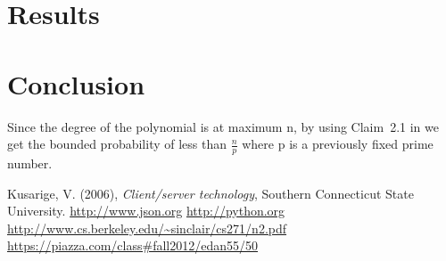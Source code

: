\documentclass{article}
\begin{document}
\section{Results}

\section{Conclusion}

Since the degree of the polynomial is at maximum n, by using Claim~2.1 in \cite[p.~2-1]{alistair} we get the bounded probability of less than $\frac{n}{p}$ where p is a previously fixed prime number.

\newpage

\begin{thebibliography}{9}
Kusarige, V. (2006), \emph{Client/server technology}, Southern Connecticut State University.
\url{http://www.json.org}
\url{http://python.org}
\url{http://www.cs.berkeley.edu/~sinclair/cs271/n2.pdf}
\url{https://piazza.com/class#fall2012/edan55/50}
\end{thebibliography}
\end{document}
